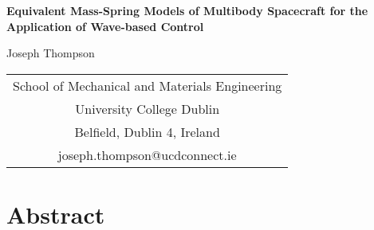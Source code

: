 \documentclass{mbd_fullpaper}
\begin{document}
\newcommand{\heading}[1]{
   {\medskip\hskip5em\bf\large{#1}
   \vskip0.5ex
   }
}
\newcommand{\eqnref}[1]{
  (\ref{#1})
}

\renewcommand{\refname}{\medskip\bf\large References}



\begin{center}
  \Large{\bf
Equivalent Mass-Spring Models of Multibody Spacecraft for the Application of Wave-based Control  }
\end{center}

\begin{center}
\large{
Joseph Thompson
}
\end{center}

{
\begin{center}
 \small
  \begin{tabular}{c}
    School of Mechanical and Materials Engineering \\
    University College Dublin              \\
    Belfield, Dublin 4, Ireland        \\
    joseph.thompson@ucdconnect.ie                        \\
  \end{tabular}
\end{center}
}




\section*{Abstract}
\end{document}
